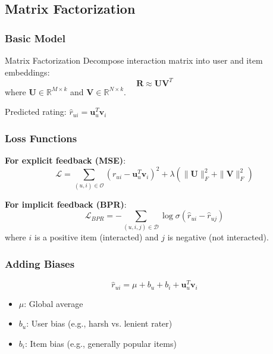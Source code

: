 \subsection{Matrix Factorization}

\subsubsection{Basic Model}

\begin{mathresult}{Matrix Factorization}
Decompose interaction matrix into user and item embeddings:
\begin{equation}
\mathbf{R} \approx \mathbf{U}\mathbf{V}^T
\end{equation}
where $\mathbf{U} \in \mathbb{R}^{M \times k}$ and $\mathbf{V} \in \mathbb{R}^{N \times k}$.

Predicted rating: $\hat{r}_{ui} = \mathbf{u}_u^T \mathbf{v}_i$
\end{mathresult}

\subsubsection{Loss Functions}

\textbf{For explicit feedback (MSE)}:
\begin{equation}
\mathcal{L} = \sum_{(u,i) \in \mathcal{O}} (r_{ui} - \mathbf{u}_u^T \mathbf{v}_i)^2 + \lambda(\|\mathbf{U}\|_F^2 + \|\mathbf{V}\|_F^2)
\end{equation}

\textbf{For implicit feedback (BPR)}:
\begin{equation}
\mathcal{L}_{BPR} = -\sum_{(u,i,j) \in \mathcal{D}} \log \sigma(\hat{r}_{ui} - \hat{r}_{uj})
\end{equation}
where $i$ is a positive item (interacted) and $j$ is negative (not interacted).

\subsubsection{Adding Biases}

\begin{equation}
\hat{r}_{ui} = \mu + b_u + b_i + \mathbf{u}_u^T \mathbf{v}_i
\end{equation}

\begin{itemize}
    \item $\mu$: Global average
    \item $b_u$: User bias (e.g., harsh vs. lenient rater)
    \item $b_i$: Item bias (e.g., generally popular items)
\end{itemize}

